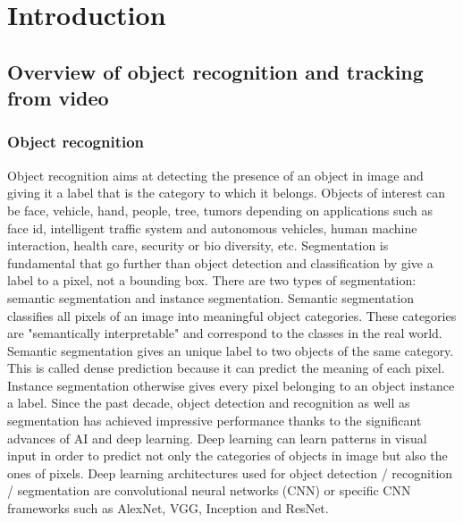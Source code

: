 \chapter{Introduction}\label{chap:intro}

\section{Overview of object recognition and tracking from video}
\subsection{Object recognition}
Object recognition aims at detecting the presence of an object in image and giving it a label that is the category to which it belongs. Objects of interest can be face, vehicle, hand, people, tree, tumors depending on applications such as face id, intelligent traffic system and autonomous vehicles, human machine interaction, health care, security or bio diversity, etc. Segmentation is fundamental that go further than object detection and classification by give a label to a pixel, not a bounding box. There are two types of segmentation: semantic segmentation and instance segmentation. Semantic segmentation classifies all pixels of an image into meaningful object categories. These categories are "semantically interpretable" and correspond to the classes in the real world. Semantic segmentation gives an unique label to two objects of the same category. This is called dense prediction because it can predict the meaning of each pixel. Instance segmentation otherwise gives every pixel belonging to an object instance a label.
Since the past decade, object detection and recognition as well as segmentation has achieved impressive performance thanks to the significant advances of AI and deep learning. Deep learning can learn patterns in visual input in order to predict not only the categories of objects in image but also the ones of pixels. Deep learning architectures used for object detection / recognition / segmentation are convolutional neural networks (CNN) or specific CNN frameworks such as AlexNet, VGG, Inception and ResNet.
